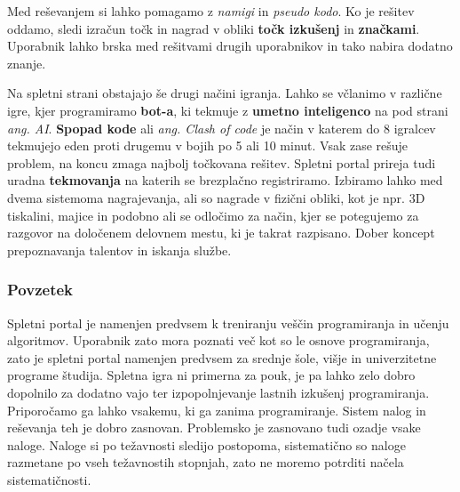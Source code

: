  Med reševanjem si lahko pomagamo z \emph{namigi} in \emph{pseudo
   kodo}. Ko je rešitev oddamo, sledi izračun točk in nagrad v obliki
 \textbf{točk izkušenj} in \textbf{značkami}. Uporabnik lahko brska
 med rešitvami drugih uporabnikov in tako nabira dodatno znanje.

 Na spletni strani obstajajo še drugi načini igranja. Lahko se
 včlanimo v različne igre, kjer programiramo \textbf{bot-a}, ki
 tekmuje z \textbf{umetno inteligenco} na pod strani
 \emph{ang. AI}. \textbf{Spopad kode} ali \emph{ang. Clash of code} je
 način v katerem do 8 igralcev tekmujejo eden proti drugemu v bojih po
 5 ali 10 minut. Vsak zase rešuje problem, na koncu zmaga najbolj
 točkovana rešitev. Spletni portal prireja tudi uradna
 \textbf{tekmovanja} na katerih se brezplačno registriramo. Izbiramo
 lahko med dvema sistemoma nagrajevanja, ali so nagrade v fizični
 obliki, kot je npr. 3D tiskalini, majice in podobno ali se odločimo
 za način, kjer se potegujemo za razgovor na določenem delovnem mestu,
 ki je takrat razpisano. Dober koncept prepoznavanja talentov in
 iskanja službe.
 
\subsubsection{Povzetek}
\label{sec:povzetek_codingame}

Spletni portal je namenjen predvsem k treniranju veščin programiranja
in učenju algoritmov. Uporabnik zato mora poznati več kot so le osnove
programiranja, zato je spletni portal namenjen predvsem za srednje
šole, višje in univerzitetne programe študija. Spletna igra ni
primerna za pouk, je pa lahko zelo dobro dopolnilo za dodatno vajo ter
izpopolnjevanje lastnih izkušenj programiranja. Priporočamo ga lahko
vsakemu, ki ga zanima programiranje. Sistem nalog in reševanja teh je
dobro zasnovan. Problemsko je zasnovano tudi ozadje vsake
naloge. Naloge si po težavnosti sledijo postopoma, sistematično so
naloge razmetane po vseh težavnostih stopnjah, zato ne moremo potrditi
načela sistematičnosti. 

